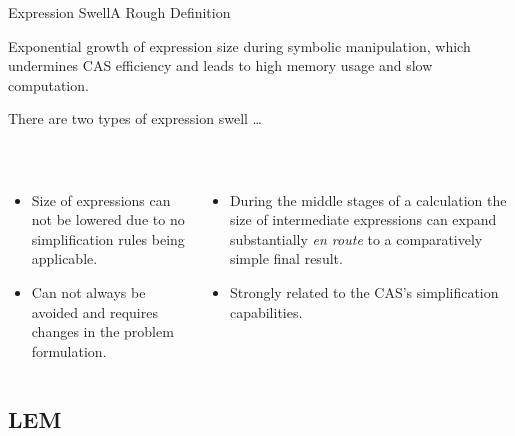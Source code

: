 \begin{frame}{Expression Swell}{A Rough Definition}
  \begin{bbox}
    Exponential growth of expression size during symbolic manipulation, which undermines \ac{CAS} efficiency and leads to high memory usage and slow computation.
  \end{bbox}
  \vspace{0.75em}
  There are two types of expression swell \dots
  \vspace{0.75em}
  \begin{columns}
    \begin{column}[t]{0.5\textwidth}
       \\
      \begin{itemize}\small
        \item Size of expressions can not be lowered due to no simplification rules being applicable.
        \item Can not always be avoided and requires changes in the problem formulation.
      \end{itemize}
    \end{column}
    \begin{column}[t]{0.5\textwidth}
       \\
      \begin{itemize}\small
        \item During the middle stages of a calculation the size of intermediate expressions can expand substantially \emph{en route} to a comparatively simple final result.
        \item Strongly related to the \ac{CAS}'s simplification capabilities.
      \end{itemize}
    \end{column}
  \end{columns}
\end{frame}

\subsection{\acl{LEM}}

